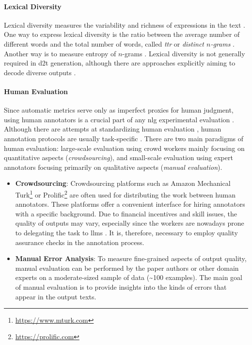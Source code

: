 {\paragraph{Lexical Diversity} Lexical diversity measures the variability and richness of expressions in the text \cite{vanmiltenburgMeasuringDiversityAutomatic2018}. One way to express lexical diversity is the ratio between the average number of different words and the total number of words, called \emph{\ac{ttr}} or \emph{distinct $n$-grams} \cite{johnson1944studies,li2016diversity}. Another way is to measure entropy of $n$-grams \cite{shannon1948mathematical}.
Lexical diversity is not generally required in \ac{d2t} generation, although there are approaches explicitly aiming to decode diverse outputs \cite{hanGeneratingDiverseDescriptions2021,perlitzDiversityEnhancedTabletoText2022}.

\paragraph{Human Evaluation} Since automatic metrics serve only as imperfect proxies for human judgment, using human annotators is a crucial part of any \ac{nlg} experimental evaluation \cite{gehrmannRepairingCrackedFoundation2022}. Although there are attempts at standardizing human evaluation \cite{thomsonGoldStandardMethodology2020}, human annotation protocols are usually task-specific \cite{van2019best,belzDisentanglingPropertiesHuman2020,howcroft2020twenty}. There are two main paradigms of human evaluation: large-scale evaluation using crowd workers mainly focusing on quantitative aspects (\emph{crowdsourcing}), and small-scale evaluation using expert annotators focusing primarily on qualitative aspects (\emph{manual evaluation}).

\begin{itemize}
    \item \textbf{Crowdsourcing}: Crowdsourcing platforms such as Amazon Mechanical Turk\footnote{\url{https://www.mturk.com}} or Prolific\footnote{\url{https://prolific.com}} are often used for distributing the work between human annotators. These platforms offer a convenient interface for hiring annotators with a specific background. Due to financial incentives and skill issues, the quality of outputs may vary, especially since the workers are nowadays prone to delegating the task to \acp{llm} \cite{veselovskyArtificialArtificialArtificial2023}. It is, therefore, necessary to employ quality assurance checks in the annotation process.
    \item \textbf{Manual Error Analysis}: To measure fine-grained aspects of output quality, manual evaluation can be performed by the paper authors or other domain experts on a moderate-sized sample of data (\textasciitilde 100 examples). The main goal of manual evaluation is to provide insights into the kinds of errors that appear in the output texts.
\end{itemize}


}
